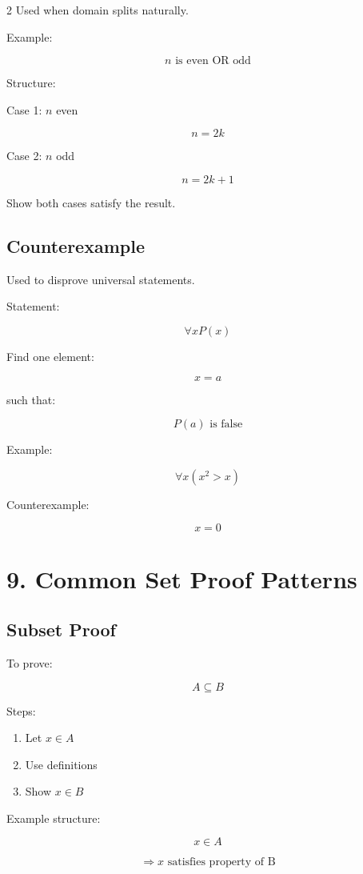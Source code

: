 \documentclass[10pt]{article}
\begin{document}
\begin{multicols}{2}
Used when domain splits naturally.

Example:

\[
n \text{ is even OR odd}
\]

Structure:

Case 1: $n$ even

\[
n = 2k
\]

Case 2: $n$ odd

\[
n = 2k+1
\]

Show both cases satisfy the result.

\subsection*{Counterexample}

Used to disprove universal statements.

Statement:

\[
\forall x P(x)
\]

Find one element:

\[
x=a
\]

such that:

\[
P(a) \text{ is false}
\]

Example:

\[
\forall x (x^2 > x)
\]

Counterexample:

\[
x=0
\]

\section*{9. Common Set Proof Patterns}

\subsection*{Subset Proof}

To prove:

\[
A \subseteq B
\]

Steps:

\begin{enumerate}
\item Let $x \in A$
\item Use definitions
\item Show $x \in B$
\end{enumerate}

Example structure:

\[
x \in A
\]

\[
\Rightarrow x \text{ satisfies property of B}
\]


\end{multicols}
\end{document}
